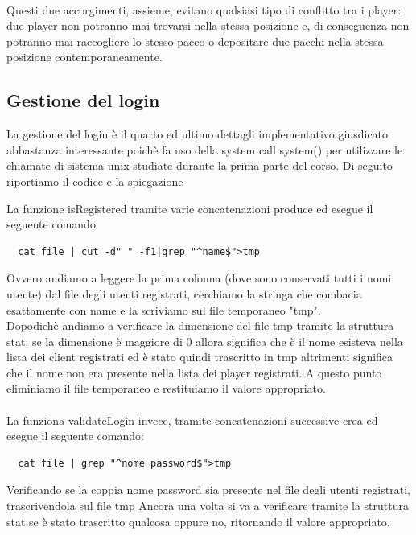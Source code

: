 \documentclass[a4paper]{article}
\begin{document}
\paragraph{}
Questi due accorgimenti, assieme, evitano qualsiasi tipo di conflitto tra i player: due player non potranno mai trovarsi nella stessa posizione
e, di conseguenza non potranno mai raccogliere lo stesso pacco o depositare due pacchi nella stessa posizione contemporaneamente.

\subsection{Gestione del login}
La gestione del login è il quarto ed ultimo dettagli implementativo giusdicato abbastanza interessante poichè
fa uso della system call system() per utilizzare le chiamate di sistema unix studiate durante la prima parte del corso.
Di seguito riportiamo il codice e la spiegazione

La funzione isRegistered tramite varie concatenazioni produce ed esegue il seguente comando 
\begin{verbatim}
  cat file | cut -d" " -f1|grep "^name$">tmp
\end{verbatim}
Ovvero andiamo a leggere la prima colonna (dove sono conservati tutti i nomi utente)
dal file degli utenti registrati, cerchiamo la stringa che combacia esattamente con name e la scriviamo sul
file temporaneo "tmp".\\ Dopodichè andiamo a verificare la dimensione del file tmp tramite la struttura stat: se
la dimensione è maggiore di 0 allora significa che è il nome esisteva nella lista dei client registrati ed è stato quindi trascritto in tmp
altrimenti significa che il nome non era presente nella lista dei player registrati.
A questo punto eliminiamo il file temporaneo e restituiamo il valore appropriato.
\paragraph{}\vspace{0.5mm}

La funziona validateLogin invece, tramite concatenazioni successive crea ed esegue il seguente comando:
\begin{verbatim}
  cat file | grep "^nome password$">tmp
\end{verbatim}
Verificando se la coppia nome password sia presente nel file degli utenti registrati, trascrivendola sul file tmp
Ancora una volta si va a verificare tramite la struttura stat se è stato trascritto qualcosa oppure no, ritornando 
il valore appropriato.
\appendix
\pagebreak
\end{document}
